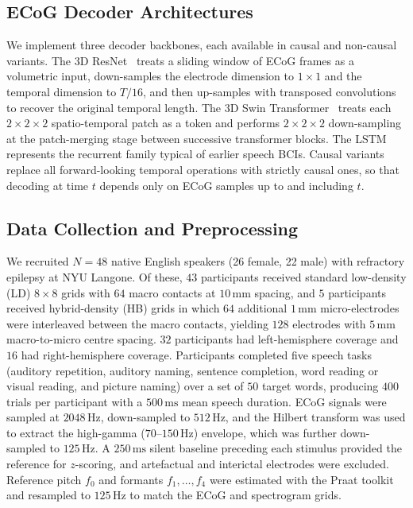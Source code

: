 \documentclass[11pt]{article}
\begin{document}
\subsection{ECoG Decoder Architectures}

We implement three decoder backbones, each available in causal and
non-causal variants. The 3D ResNet~\cite{he2016deep} treats a sliding
window of ECoG frames as a volumetric input, down-samples the electrode
dimension to $1\times1$ and the temporal dimension to $T/16$, and then
up-samples with transposed convolutions to recover the original temporal
length. The 3D Swin Transformer~\cite{liu2021swin,liu2022video} treats
each $2\times2\times2$ spatio-temporal patch as a token and performs
$2\times2\times2$ down-sampling at the patch-merging stage between
successive transformer blocks. The LSTM~\cite{hochreiter1997lstm} represents
the recurrent family typical of earlier speech BCIs. Causal variants
replace all forward-looking temporal operations with strictly causal ones,
so that decoding at time $t$ depends only on ECoG samples up to and
including $t$.

\subsection{Data Collection and Preprocessing}

We recruited $N=48$ native English speakers (26 female, 22 male) with
refractory epilepsy at NYU Langone. Of these, $43$ participants received
standard low-density (LD) $8\times8$ grids with $64$ macro contacts at
$10\,\mathrm{mm}$ spacing, and $5$ participants received hybrid-density
(HB) grids in which $64$ additional $1\,\mathrm{mm}$ micro-electrodes were
interleaved between the macro contacts, yielding $128$ electrodes with
$5\,\mathrm{mm}$ macro-to-micro centre spacing. $32$ participants had
left-hemisphere coverage and $16$ had right-hemisphere coverage.
Participants completed five speech tasks (auditory repetition, auditory
naming, sentence completion, word reading or visual reading, and picture
naming) over a set of $50$ target words, producing $400$ trials per
participant with a $500\,\mathrm{ms}$ mean speech duration. ECoG signals
were sampled at $2048\,\mathrm{Hz}$, down-sampled to $512\,\mathrm{Hz}$,
and the Hilbert transform was used to extract the high-gamma
($70$--$150\,\mathrm{Hz}$) envelope, which was further down-sampled to
$125\,\mathrm{Hz}$. A $250\,\mathrm{ms}$ silent baseline preceding each
stimulus provided the reference for $z$-scoring, and artefactual and
interictal electrodes were excluded. Reference pitch $f_0$ and formants
$f_1,\dots,f_4$ were estimated with the Praat
toolkit~\cite{boersma2001praat} and resampled to $125\,\mathrm{Hz}$ to
match the ECoG and spectrogram grids.
\end{document}
